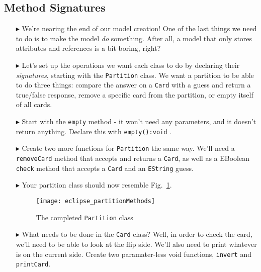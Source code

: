 \newpage
\subsection{Method Signatures}
\texHeader
\hypertarget{static:methods tex}{}

\begin{itemize}

\item[$\blacktriangleright$] We're nearing the end of our model creation! One of the last things we need to do is to make the model \emph{do} something. After
all, a model that only stores attributes and references is a bit boring, right?

\item[$\blacktriangleright$] Let's set up the operations we want each class to do by declaring their \emph{signatures}, starting with the
\texttt{Partition} class. We want a partition to be able to do three things: compare the answer on a \texttt{Card} with a guess and return a true/false
response, remove a specific card from the partition, or empty itself of all cards.

\item[$\blacktriangleright$] Start with the \texttt{empty} method - it won't need any parameters, and it doesn't return anything. Declare this with
\texttt{empty():void} .

\item[$\blacktriangleright$] Create two more functions for \texttt{Partition} the same way. We'll need a \texttt{removeCard} method that accepts and returns a
\texttt{Card}, as well as a EBoolean \texttt{check} method that accepts a \texttt{Card} and an \texttt{EString} guess. 

\item[$\blacktriangleright$] Your partition class should now resemble Fig.~\ref{fig:partitionMethods}.

\vspace{0.5cm}

\begin{figure}[htbp]
	\centering
  \texttt{[image: eclipse\_partitionMethods]}
	\caption{The completed \texttt{Partition} class}
	\label{fig:partitionMethods}
\end{figure}

\vspace{0.5cm}

\item[$\blacktriangleright$] What needs to be done in the \texttt{Card} class? Well, in order to check the card, we'll need to be able to look at the flip side.
We'll also need to print whatever is on the current side. Create two paramater-less void functions, \texttt{invert} and \texttt{printCard}. 


\end{itemize}
